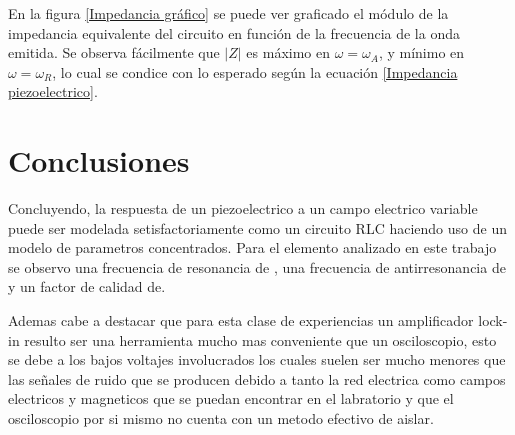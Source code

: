 \documentclass{article}
\begin{document}
En la figura \ref{Impedancia gráfico} se puede ver graficado el módulo de la
impedancia equivalente del circuito en función de la frecuencia de la onda
emitida. Se observa fácilmente que $\left|Z\right|$ es máximo en
$\omega=\omega_A$, y mínimo en $\omega=\omega_R$, lo cual se condice con lo
esperado según la ecuación \ref{Impedancia piezoelectrico}.

\newpage

\section{Conclusiones}

Concluyendo, la respuesta de un piezoelectrico a un campo electrico variable
puede ser modelada setisfactoriamente como un circuito RLC haciendo uso de un
modelo de parametros concentrados. Para el elemento analizado en este trabajo
se observo una frecuencia de resonancia de , una frecuencia de antirresonancia
de y un factor de calidad de.

Ademas cabe a destacar que para esta clase de experiencias un amplificador
lock-in resulto ser una herramienta mucho mas conveniente que un osciloscopio,
esto se debe a los bajos voltajes involucrados los cuales suelen ser mucho
menores que las señales de ruido que se producen debido a tanto la red
electrica como campos electricos y magneticos que se puedan encontrar en el
labratorio y que el osciloscopio por si mismo no cuenta con un metodo efectivo
de aislar.

\printbibliography
\end{document}
